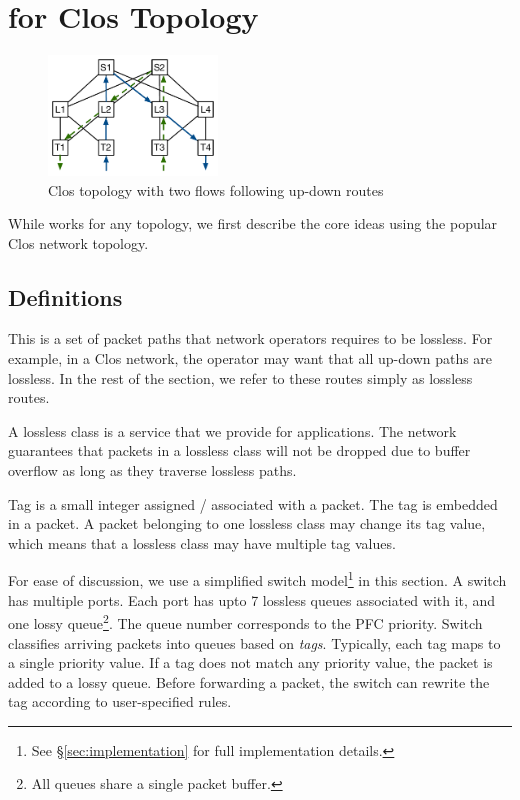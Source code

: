 \section{\sysname{} for Clos Topology}
\label{sec:specific}

\begin{figure}[t]
		\centering
		\includegraphics[width=0.4\textwidth] {figs/updown_paths}
		\caption{Clos topology with two flows following up-down routes}
		\label{fig:basic_clos}
\end{figure}

While \sysname{} works for any topology, we first describe the core ideas using
the popular Clos network topology.

\subsection {Definitions}

 This is a set of packet paths that network
operators requires to be lossless. For example, in a Clos network, the
operator may want that all up-down paths are lossless. In the rest of the
section, we refer to these routes simply as lossless routes.

 A lossless class is a service that we provide for
applications. The network guarantees that packets in a lossless class will
not be dropped due to buffer overflow as long as they traverse lossless paths.

 Tag is a small integer assigned / associated with a packet. The tag
is embedded in a packet. A packet belonging to one lossless class may change its
tag value, which means that a lossless class may have multiple tag values.

 For ease of discussion, we use a simplified
switch model\footnote{See \S\ref{sec:implementation} for full implementation
details.} in this section.  A switch has multiple ports. Each port has upto 7
lossless queues associated with it, and one lossy queue\footnote{All queues
share a single packet buffer.}. The queue number corresponds to the PFC priority.
Switch classifies arriving packets into queues based on {\em tags}.  Typically,
each tag maps to a single priority value. If a tag does not match any priority
value, the packet is added to a lossy queue. Before forwarding a packet, the
switch can rewrite the tag according to user-specified rules.

